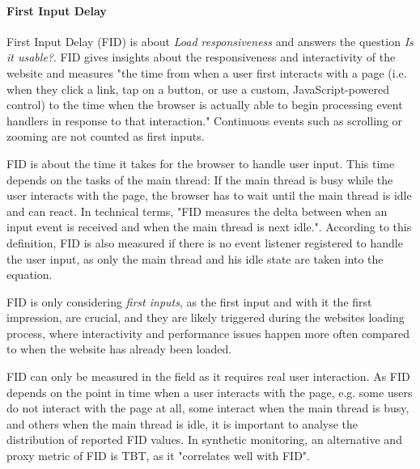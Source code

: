 




\paragraph{First Input Delay}


First Input Delay (FID) is about \textit{Load responsiveness} and answers the question \textit{Is it usable?}.
FID gives insights about the responsiveness and interactivity of the website and measures "the time from when a user first interacts with a page (i.e. when they click a link, tap on a button, or use a custom, JavaScript-powered control) to the time when the browser is actually able to begin processing event handlers in response to that interaction."
Continuous events such as scrolling or zooming are not counted as first inputs.

FID is about the time it takes for the browser to handle user input.
This time depends on the tasks of the main thread:
If the main thread is busy while the user interacts with the page, the browser has to wait until the main thread is idle and can react.
In technical terms, "FID measures the delta between when an input event is received and when the main thread is next idle.".
According to this definition, FID is also measured if there is no event listener registered to handle the user input, as only the main thread and his idle state are taken into the equation.

FID is only considering \textit{first inputs}, as the first input and with it the first impression, are crucial, and they are likely triggered during the websites loading process, where interactivity and performance issues happen more often compared to when the website has already been loaded.



FID can only be measured in the field as it requires real user interaction.
As FID depends on the point in time when a user interacts with the page, e.g. some users do not interact with the page at all, some interact when the main thread is busy, and others when the main thread is idle, it is important to analyse the distribution of reported FID values.
In synthetic monitoring, an alternative and proxy metric of FID is TBT, as it "correlates well with FID". %


